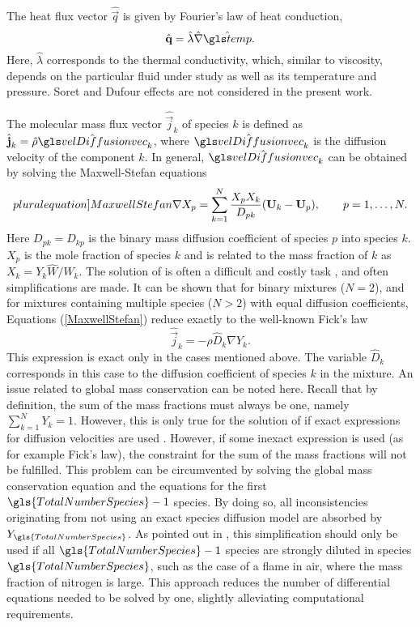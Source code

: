The heat flux vector $\hat{\vec{q}}$ is given by Fourier's law of heat conduction,
\begin{equation}
	\hat{\vec{q}} = \hat \lambda \hat{\nabla} \glsHat{temp}.
	\label{eq:fourierLaw}
\end{equation}
Here, $\hat \lambda$ corresponds to the thermal conductivity, which, similar to viscosity, depends on the particular fluid under study as well as its temperature and pressure. Soret and Dufour effects are not considered in the present work.

The molecular mass flux vector $\hat{\vec{j}}_k$ of species $k$ is defined as $ \hat{\vec{j}}_k = \hat \rho \glsHat{velDiffusionvec}_k$, where $\glsHat{velDiffusionvec}_k$ is the diffusion velocity of the component $k$. In general, $\glsHat{velDiffusionvec}_k$ can be obtained by solving the Maxwell-Stefan equations
\begin{equation}\label[pluralequation]{MaxwellStefan}
	\nabla X_p = \sum_{k=1}^{N}\frac{X_p X_k}{D_{pk}}(\vec{U}_k-\vec{U}_p), \qquad p = 1,\dots,N. 
\end{equation}
Here $D_{pk} = D_{kp}$ is the binary mass diffusion coefficient of species $p$ into species $k$. $X_p$ is the mole fraction of species $k$ and is related to the mass fraction of $k$ as $ X_k = Y_k \hat W /\hat W_k$.
The solution of  is often a difficult and costly task \parencite{williamsCombustionTheoryFundamental2000,poinsotTheoreticalNumericalCombustion2011}, and often simplifications are made. It can be shown that for binary mixtures ($N = 2$), and for mixtures containing multiple species ($N>2$) with equal diffusion coefficients, Equations (\ref{MaxwellStefan}) reduce exactly to the well-known Fick's law
\begin{equation}
	\hat{\vec{j}}_k = -\rho \hat D_k \nabla Y_k.
\end{equation}\label{eq:FickLaw}
This expression is exact only in the cases mentioned above. The variable $\hat D_k$ corresponds in this case to the diffusion coefficient of species $k$ in the mixture. An issue related to global mass conservation can be noted here. Recall that by definition, the sum of the mass fractions must always be one, namely $ \sum_{k=1}^{N}Y_k = 1$. However, this is only true for the solution of  if exact expressions for diffusion velocities are used \parencite{poinsotTheoreticalNumericalCombustion2011}. However, if some inexact expression is used (as for example Fick's law), the constraint for the sum of the mass fractions will not be fulfilled. This problem can be circumvented by solving the global mass conservation equation and  the equations for the first $\gls{TotalNumberSpecies} - 1$ species. By doing so, all inconsistencies originating from not using an exact species diffusion model are absorbed by $Y_{\gls{TotalNumberSpecies}}$. As pointed out in \textcite{poinsotTheoreticalNumericalCombustion2011}, this simplification should only be used if all $\gls{TotalNumberSpecies}-1$ species are strongly diluted in species $\gls{TotalNumberSpecies}$, such as the case of a flame in air, where the mass fraction of nitrogen is large. This approach reduces the number of differential equations needed to be solved by one, slightly alleviating computational requirements.

